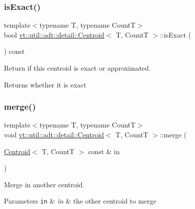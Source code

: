 \subsubsection{\texorpdfstring{is\+Exact()}{isExact()}}
{\footnotesize\ttfamily template$<$typename T, typename CountT$>$ \\
bool \hyperlink{structvt_1_1util_1_1adt_1_1detail_1_1_centroid}{vt\+::util\+::adt\+::detail\+::\+Centroid}$<$ T, CountT $>$\+::is\+Exact (\begin{DoxyParamCaption}{ }\end{DoxyParamCaption}) const\hspace{0.3cm}{\ttfamily [inline]}}



Return if this centroid is exact or approximated. 

\begin{DoxyReturn}{Returns}
whether it is exact 
\end{DoxyReturn}
\mbox{\label{structvt_1_1util_1_1adt_1_1detail_1_1_centroid_acad584e6798cbc7619d2b09f3f0cc06b}} 
\subsubsection{\texorpdfstring{merge()}{merge()}}
{\footnotesize\ttfamily template$<$typename T, typename CountT$>$ \\
void \hyperlink{structvt_1_1util_1_1adt_1_1detail_1_1_centroid}{vt\+::util\+::adt\+::detail\+::\+Centroid}$<$ T, CountT $>$\+::merge (\begin{DoxyParamCaption}\item[{\hyperlink{structvt_1_1util_1_1adt_1_1detail_1_1_centroid}{Centroid}$<$ T, CountT $>$ const \&}]{in }\end{DoxyParamCaption})\hspace{0.3cm}{\ttfamily [inline]}}



Merge in another centroid. 


\begin{DoxyParams}[1]{Parameters}
\mbox{\tt in}  & {\em in} & the other centroid to merge \\
\hline
\end{DoxyParams}
\mbox{\label{structvt_1_1util_1_1adt_1_1detail_1_1_centroid_ad681c6c08ec1b8c48895b75ec370fa84}} 
